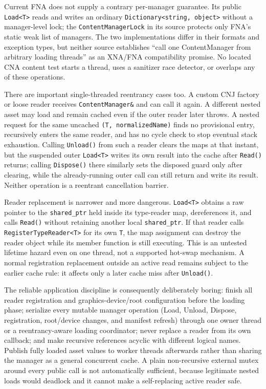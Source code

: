 Current FNA does not supply a contrary per-manager guarantee. Its public \texttt{Load<T>} reads
and writes an ordinary \texttt{Dictionary<string, object>} without a manager-level lock; the
\texttt{ContentManagerLock} in its source protects only FNA's static weak list of managers. The
two implementations differ in their formats and exception types, but neither source establishes
``call one ContentManager from arbitrary loading threads'' as an XNA/FNA compatibility promise.
No located CNA content test starts a thread, uses a sanitizer race detector, or overlaps any of
these operations.

There are important single-threaded reentrancy cases too. A custom CNJ factory or loose reader
receives \texttt{ContentManager\&} and can call it again. A different nested asset may load and
remain cached even if the outer reader later throws. A nested request for the same uncached
\texttt{(T, normalizedName)} finds no provisional entry, recursively enters the same reader, and
has no cycle check to stop eventual stack exhaustion. Calling \texttt{Unload()} from such a
reader clears the maps at that instant, but the suspended outer \texttt{Load<T>} writes its own
result into the cache after \texttt{Read()} returns; calling \texttt{Dispose()} there similarly
sets the disposed guard only after clearing, while the already-running outer call can still return
and write its result. Neither operation is a reentrant cancellation barrier.

Reader replacement is narrower and more dangerous. \texttt{Load<T>} obtains a raw pointer to the
\texttt{shared\_ptr} held inside its type-reader map, dereferences it, and calls \texttt{Read()}
without retaining another local \texttt{shared\_ptr}. If that reader calls
\texttt{RegisterTypeReader<T>} for its own \texttt{T}, the map assignment can destroy the reader
object while its member function is still executing. This is an untested lifetime hazard even on
one thread, not a supported hot-swap mechanism. A normal registration replacement outside an
active read remains subject to the earlier cache rule: it affects only a later cache miss after
\texttt{Unload()}.

The reliable application discipline is consequently deliberately boring: finish all reader
registration and graphics-device/root configuration before the loading phase; serialize every
mutable manager operation (Load, Unload, Dispose, registration, root/device changes, and manifest
refresh) through one owner thread or a reentrancy-aware loading coordinator; never replace a
reader from its own callback; and make recursive references acyclic with different logical names.
Publish fully loaded asset values to worker threads afterwards rather than sharing the manager as
a general concurrent cache. A plain non-recursive external mutex around every public call is not
automatically sufficient, because legitimate nested loads would deadlock and it cannot make a
self-replacing active reader safe.

